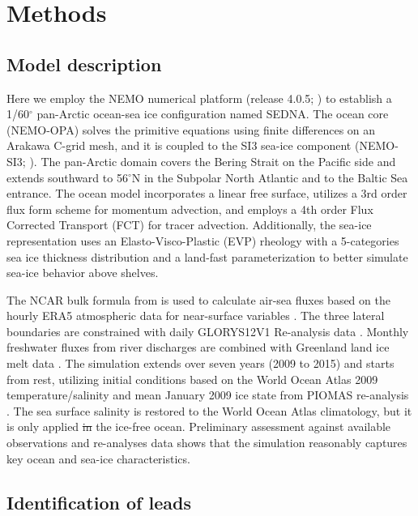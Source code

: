 \documentclass[lineno,sn-basic]{sn-jnl}%
\providecommand{\DIFadd}[1]{{\protect\color{blue}\uwave{#1}}} %
\providecommand{\DIFdel}[1]{{\protect\color{red}\sout{#1}}}                      %
\providecommand{\DIFaddbegin}{} %
\providecommand{\DIFaddend}{} %
\providecommand{\DIFdelbegin}{} %
\providecommand{\DIFdelend}{} %
\newcommand{\DIFscaledelfig}{0.5}
\newlength{\DIFdelgraphicswidth} %
\newlength{\DIFdelgraphicsheight} %
\newcommand{\DIFaddincludegraphics}[2][]{{\color{blue}\fbox{\DIFOincludegraphics[#1]{#2}}}} %
\newcommand{\DIFdelincludegraphics}[2][]{%
\sbox{\DIFdelgraphicsbox}{\DIFOincludegraphics[#1]{#2}}%
\settoboxwidth{\DIFdelgraphicswidth}{\DIFdelgraphicsbox} %
\settoboxtotalheight{\DIFdelgraphicsheight}{\DIFdelgraphicsbox} %
\scalebox{\DIFscaledelfig}{%
\parbox[b]{\DIFdelgraphicswidth}{\usebox{\DIFdelgraphicsbox}\\[-\baselineskip] \rule{\DIFdelgraphicswidth}{0em}}\llap{\resizebox{\DIFdelgraphicswidth}{\DIFdelgraphicsheight}{%
\setlength{\unitlength}{\DIFdelgraphicswidth}%
\begin{picture}(1,1)%
\thicklines\linethickness{2pt} %
{\color[rgb]{1,0,0}\put(0,0){\framebox(1,1){}}}%
{\color[rgb]{1,0,0}\put(0,0){\line( 1,1){1}}}%
{\color[rgb]{1,0,0}\put(0,1){\line(1,-1){1}}}%
\end{picture}%
}\hspace*{3pt}}} %
} %
\DeclareRobustCommand{\DIFaddbegin}{\DIFOaddbegin \let\includegraphics\DIFaddincludegraphics} %
\DeclareRobustCommand{\DIFaddend}{\DIFOaddend \let\includegraphics\DIFOincludegraphics} %
\DeclareRobustCommand{\DIFdelbegin}{\DIFOdelbegin \let\includegraphics\DIFdelincludegraphics} %
\DeclareRobustCommand{\DIFdelend}{\DIFOaddend \let\includegraphics\DIFOincludegraphics} %
\begin{document}
\section{Methods}
\subsection*{Model description}

Here we employ the NEMO numerical platform (release 4.0.5; \citealp{NEMO_man}) to establish a 1/60$^\circ$ pan-Arctic ocean-sea ice configuration named SEDNA. The ocean core (NEMO-OPA) solves the primitive equations using finite differences on an Arakawa C-grid mesh, and it is coupled to the SI3 sea-ice component (NEMO-SI3; \citealp{SI3_man}). The pan-Arctic domain covers the Bering Strait on the Pacific side and extends southward to 56$^\circ$N in the Subpolar North Atlantic and to the Baltic Sea entrance. The ocean model incorporates a linear free surface, utilizes a 3rd order flux form scheme for momentum advection, and employs a 4th order Flux Corrected Transport (FCT) for tracer advection. Additionally, the sea-ice representation uses an Elasto-Visco-Plastic (EVP) rheology with a 5-categories sea ice thickness distribution and a land-fast parameterization to better simulate sea-ice behavior above shelves.

The NCAR bulk formula from \citet{Large_global_2009} is used to calculate air-sea fluxes based on the hourly ERA5 atmospheric data for near-surface variables \citep{Hersbach_ERA5_2020}. The three lateral boundaries are constrained with daily GLORYS12V1 Re-analysis data \citep{GLORYS12}. Monthly freshwater fluxes from river discharges are combined with Greenland land ice melt data \citep{HuEA_rivers_2019}. The simulation extends over seven years (2009 to 2015) and starts from rest, utilizing initial conditions based on the World Ocean Atlas 2009 temperature/salinity and mean January 2009 ice state from PIOMAS re-analysis \citep{Locarnini_data_2010, PIOMAS}. The sea surface salinity is restored to the World Ocean Atlas climatology, but it is only applied \DIFdelbegin \DIFdel{in }\DIFdelend \DIFaddbegin \DIFadd{over }\DIFaddend the ice-free ocean. Preliminary assessment against available observations and re-analyses data shows that the simulation reasonably captures key ocean and sea-ice characteristics.

\subsection*{Identification of leads}
\end{document}
